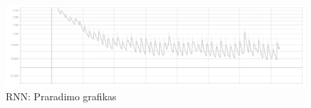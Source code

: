 \documentclass{VUMIFPSbakalaurinis}
\begin{document}
\begin{figure}[H]
	\centering
	\includegraphics[scale=0.3]{img/3/loss}
	\caption{RNN: Praradimo grafikas}
	\label{img:25loss}
\end{figure}
\end{document}
